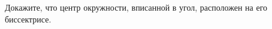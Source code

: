 \begin{ex}
	\begin{condition}
		Докажите, что центр окружности, вписанной в угол, расположен на его биссектрисе.
	\end{condition}
\end{ex}